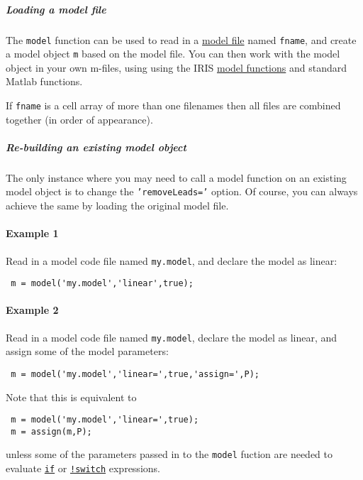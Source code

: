  \subparagraph{Loading a model file}
 
 The \texttt{model} function can be used to read in a
 \href{modellang/Contents}{model file} named \texttt{fname}, and create a
 model object \texttt{m} based on the model file. You can then work with
 the model object in your own m-files, using using the IRIS
 \href{model/Contents}{model functions} and standard Matlab functions.
 
 If \texttt{fname} is a cell array of more than one filenames then all
 files are combined together (in order of appearance).
 
 \subparagraph{Re-building an existing model object}
 
 The only instance where you may need to call a model function on an
 existing model object is to change the \texttt{'removeLeads='} option.
 Of course, you can always achieve the same by loading the original model
 file.
 
 \paragraph{Example 1}
 
 Read in a model code file named \texttt{my.model}, and declare the model
 as linear:
 
 \begin{verbatim}
 m = model('my.model','linear',true);
 \end{verbatim}
 
 \paragraph{Example 2}
 
 Read in a model code file named \texttt{my.model}, declare the model as
 linear, and assign some of the model parameters:
 
 \begin{verbatim}
 m = model('my.model','linear=',true,'assign=',P);
 \end{verbatim}
 
 Note that this is equivalent to
 
 \begin{verbatim}
 m = model('my.model','linear=',true);
 m = assign(m,P);
 \end{verbatim}
 
 unless some of the parameters passed in to the \texttt{model} fuction
 are needed to evaluate \href{modellang/if}{\texttt{if}} or
 \href{modellang/switch}{\texttt{!switch}} expressions.


